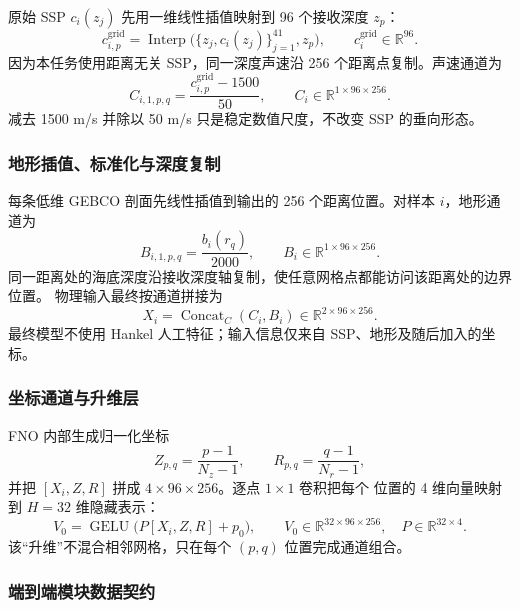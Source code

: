 \documentclass[UTF8,11pt]{ctexart}
\begin{document}
原始 SSP $c_i(z_j)$ 先用一维线性插值映射到 96 个接收深度 $z_p$：
\begin{equation}
  c^{\mathrm{grid}}_{i,p}=\operatorname{Interp}
  \big(\{z_j,c_i(z_j)\}_{j=1}^{41},z_p\big),
  \qquad c^{\mathrm{grid}}_i\in\mathbb{R}^{96}.
\end{equation}
因为本任务使用距离无关 SSP，同一深度声速沿 256 个距离点复制。声速通道为
\begin{equation}
  C_{i,1,p,q}=\frac{c^{\mathrm{grid}}_{i,p}-1500}{50},\qquad
  C_i\in\mathbb{R}^{1\times96\times256}.
\end{equation}
减去 1500 m/s 并除以 50 m/s 只是稳定数值尺度，不改变 SSP 的垂向形态。

\subsubsection{地形插值、标准化与深度复制}

每条低维 GEBCO 剖面先线性插值到输出的 256 个距离位置。对样本 $i$，地形通道为
\begin{equation}
  B_{i,1,p,q}=\frac{b_i(r_q)}{2000},\qquad
  B_i\in\mathbb{R}^{1\times96\times256}.
\end{equation}
同一距离处的海底深度沿接收深度轴复制，使任意网格点都能访问该距离处的边界位置。
物理输入最终按通道拼接为
\begin{equation}
  X_i=\operatorname{Concat}_{C}(C_i,B_i)
  \in\mathbb{R}^{2\times96\times256}.
\end{equation}
最终模型不使用 Hankel 人工特征；输入信息仅来自 SSP、地形及随后加入的坐标。

\subsubsection{坐标通道与升维层}

FNO 内部生成归一化坐标
\begin{equation}
  Z_{p,q}=\frac{p-1}{N_z-1},\qquad R_{p,q}=\frac{q-1}{N_r-1},
\end{equation}
并把 $[X_i,Z,R]$ 拼成 $4\times96\times256$。逐点 $1\times1$ 卷积把每个
位置的 4 维向量映射到 $H=32$ 维隐藏表示：
\begin{equation}
  V_0=\operatorname{GELU}\big(P[X_i,Z,R]+p_0\big),\qquad
  V_0\in\mathbb{R}^{32\times96\times256},\quad P\in\mathbb{R}^{32\times4}.
\end{equation}
该“升维”不混合相邻网格，只在每个 $(p,q)$ 位置完成通道组合。

\subsubsection{端到端模块数据契约}
\end{document}
